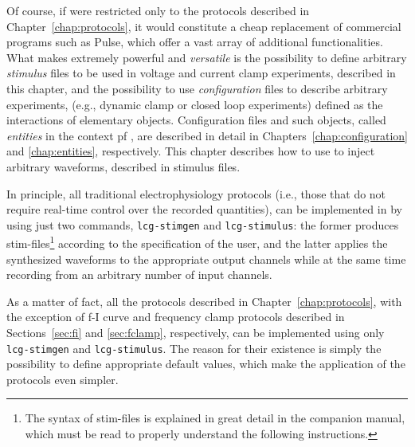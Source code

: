 Of course, if \progname were restricted only to the protocols
described in Chapter~\ref{chap:protocols}, it would constitute a
cheap replacement of commercial programs such as Pulse, which offer a
vast array of additional functionalities. What makes \progname
extremely powerful and \emph{versatile} is the possibility to define
arbitrary \emph{stimulus} files to be used in voltage and current
clamp experiments, described in this chapter, and the possibility to
use \emph{configuration} files to describe arbitrary experiments,
(e.g., dynamic clamp or closed loop experiments) defined as the
interactions of elementary objects. Configuration files and such
objects, called \emph{entities} in the context pf \progname, are
described in detail in Chapters~\ref{chap:configuration} and
\ref{chap:entities}, respectively. This chapter describes how to use
\progname to inject arbitrary waveforms, described in stimulus files.

In principle, all traditional electrophysiology protocols (i.e., those
that do not require real-time control over the recorded quantities),
can be implemented in \progname by using just two commands,
\verb+lcg-stimgen+ and \verb+lcg-stimulus+: the former produces
stim-files\footnote{The syntax of stim-files is explained in great
  detail in the companion manual, which must be read to properly
  understand the following instructions.} according to the
specification of the user, and the
latter applies the synthesized waveforms to the appropriate output
channels while at the same time recording from an arbitrary number of
input channels. 

As a matter of fact, all the protocols described in
Chapter~\ref{chap:protocols}, with the exception of f-I
curve and frequency clamp protocols described in Sections~\ref{sec:fi}
and \ref{sec:fclamp}, respectively, can be implemented using only
\verb+lcg-stimgen+ and \verb+lcg-stimulus+. The reason for their
existence is simply the possibility to define appropriate default
values, which make the application of the protocols even simpler.

